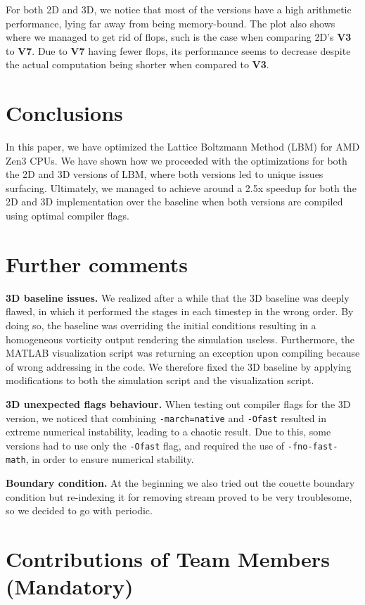 \documentclass[letterpaper]{article}
\newcommand{\mypar}[1]{{\bf #1.}}
\begin{document}
For both 2D and 3D, we notice that most of the versions have a high arithmetic performance, lying far away from being memory-bound.
The plot also shows where we managed to get rid of flops, such is the case when comparing 2D's \textbf{V3} to \textbf{V7}.  
Due to \textbf{V7} having fewer flops, its performance seems to decrease despite the actual computation being shorter when compared to \textbf{V3}.

\section{Conclusions}

In this paper, we have optimized the Lattice Boltzmann Method (LBM) for AMD Zen3 CPUs.
We have shown how we proceeded with the optimizations for both the 2D and 3D versions of LBM, where both versions led to unique issues surfacing.  
Ultimately, we managed to achieve around a 2.5x speedup for both the 2D and 3D implementation over the baseline when both versions are compiled using optimal compiler flags.

\section{Further comments}
\mypar{3D baseline issues} We realized after a while that the 3D baseline was deeply flawed, in which it performed the stages in each timestep in the wrong order. By doing so, the baseline was overriding the initial conditions resulting in a homogeneous vorticity output rendering the simulation useless. Furthermore, the MATLAB visualization script was returning an exception upon compiling because of wrong addressing in the code. We therefore fixed the 3D baseline by applying modifications to both the simulation script and the visualization script.

\mypar{3D unexpected flags behaviour}
When testing out compiler flags for the 3D version, we noticed that combining \texttt{-march=native} and \texttt{-Ofast} resulted in extreme numerical instability, leading to a chaotic result.
Due to this, some versions had to use only the \texttt{-Ofast} flag, and required the use of \texttt{-fno-fast-math}, in order to ensure numerical stability.

\mypar{Boundary condition} At the beginning we also tried out the couette boundary condition but re-indexing it for removing stream proved to be very troublesome, so we decided to go with periodic.


\section{Contributions of Team Members (Mandatory)}
\end{document}
